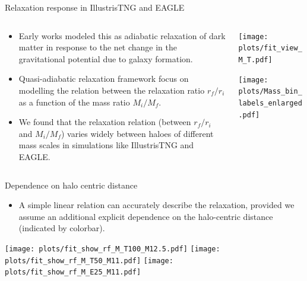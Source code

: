 \documentclass{beamer}
\begin{document}
\begin{frame}{Relaxation response in IllustrisTNG and EAGLE}
\begin{columns}
\begin{column}{0.54\linewidth}
    \begin{itemize}
        \item Early works modeled this as adiabatic relaxation of dark matter in response to the net change in the gravitational potential due to galaxy formation.
        \item Quasi-adiabatic relaxation framework focus on modelling the relation between the relaxation ratio $r_f/r_i$ as a function of the mass ratio $M_i/M_f$.
        \item We found that the relaxation relation (between $r_f/r_i$ and $M_i/M_f$) varies widely between haloes of different mass scales in simulations like IllustrisTNG and EAGLE.
    \end{itemize}
    
\end{column}
\begin{column}{0.45\linewidth}
    \begin{center}
        \texttt{[image: plots/fit\_view\_M\_T.pdf]}
    \end{center}
    \begin{center}
        \texttt{[image: plots/Mass\_bin\_labels\_enlarged.pdf]}
    \end{center}
\end{column}
\end{columns}
\end{frame}

\begin{frame}{Dependence on halo centric distance}
\begin{itemize}
    \item A simple linear relation can accurately describe the relaxation, provided we assume an additional explicit dependence on the halo-centric distance (indicated by colorbar).
\end{itemize}
\begin{center}
    \texttt{[image: plots/fit\_show\_rf\_M\_T100\_M12.5.pdf]}
    \texttt{[image: plots/fit\_show\_rf\_M\_T50\_M11.pdf]}
    \texttt{[image: plots/fit\_show\_rf\_M\_E25\_M11.pdf]}
\end{center}
\end{frame}
\end{document}
